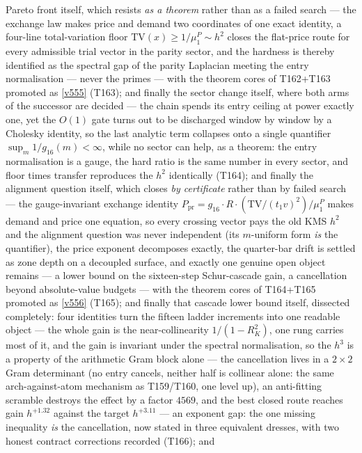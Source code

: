 \documentclass[11pt,a4paper]{article}
\begin{document}
Pareto front itself, which resists \emph{as a theorem} rather than as a failed search --- the
exchange law makes price and demand two coordinates of one exact identity, a four-line
total-variation floor $\mathrm{TV}(x)\ge1/\mu^P_1\sim h^2$ closes the flat-price route for
every admissible trial vector in the parity sector, and the hardness is thereby identified as
the spectral gap of the parity Laplacian meeting the entry normalisation --- never the
primes --- with the theorem cores of T162+T163 promoted as \vref{v555} (T163); and finally the
sector change itself, where both arms of the successor are decided --- the chain spends its
entry ceiling at power exactly one, yet the $O(1)$ gate turns out to be discharged window by
window by a Cholesky identity, so the last analytic term collapses onto a single quantifier
$\sup_m 1/g_{16}(m)<\infty$, while no sector can help, as a theorem: the entry normalisation
is a gauge, the hard ratio is the same number in every sector, and floor times transfer
reproduces the $h^2$ identically (T164); and finally the alignment question itself, which
closes \emph{by certificate} rather than by failed search --- the gauge-invariant exchange
identity $P_{\mathrm{pr}}=g_{16}\cdot R\cdot(\mathrm{TV}/(t_1v)^2)/\mu^P_1$ makes demand and
price one equation, so every crossing vector pays the old KMS $h^2$ and the alignment
question was never independent (its $m$-uniform form \emph{is} the quantifier), the price
exponent decomposes exactly, the quarter-bar drift is settled as zone depth on a decoupled
surface, and exactly one genuine open object remains --- a lower bound on the sixteen-step
Schur-cascade gain, a cancellation beyond absolute-value budgets --- with the theorem cores
of T164+T165 promoted as \vref{v556} (T165); and finally that cascade lower bound itself,
dissected completely: four identities turn the fifteen ladder increments into one readable
object --- the whole gain is the near-collinearity $1/(1-R_K^2)$, one rung carries most of
it, and the gain is invariant under the spectral normalisation, so the $h^3$ is a property
of the arithmetic Gram block alone --- the cancellation lives in a $2\times2$ Gram
determinant (no entry cancels, neither half is collinear alone: the same arch-against-atom
mechanism as T159/T160, one level up), an anti-fitting scramble destroys the effect by a
factor $4569$, and the best closed route reaches gain $h^{+1.32}$ against the target
$h^{+3.11}$ --- an exponent gap: the one missing inequality \emph{is} the cancellation, now
stated in three equivalent dresses, with two honest contract corrections recorded (T166); and
\end{document}
